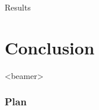 \documentclass{beamer}
\begin{document}
\begin{frame}{Results}
\begin{figure}[H]
{		
	}
\end{figure}
\end{frame}

\section{Conclusion}
\begin{frame}<beamer>
  \frametitle{Plan}
  \tableofcontents[currentsection]
\end{frame}
\end{document}
